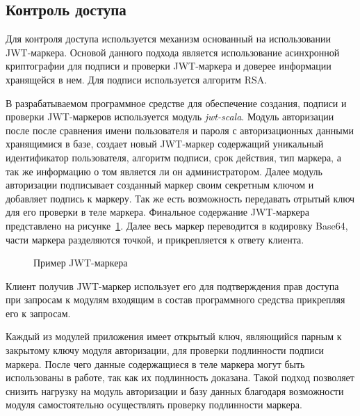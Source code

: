 \subsection{Контроль доступа}
\label{sec:development:access_control}
Для контроля доступа используется механизм основанный на использовании JWT-маркера. Основой данного подхода является использование асинхронной криптографии для подписи и проверки JWT-маркера и доверее информации хранящейся в нем. Для подписи используется алгоритм RSA.

В разрабатываемом программное средстве для обеспечение создания, подписи и проверки JWT-маркеров используется модуль \emph{jwt-scala}. Модуль авторизации после после сравнения имени пользователя и пароля с авторизационных данными хранящимися в базе, создает новый JWT-маркер содержащий уникальный идентификатор пользователя, алгоритм подписи, срок действия, тип маркера, а так же информацию о том является ли он администратором. Далее модуль авторизации подписывает созданный маркер своим секретным ключом и добавляет подпись к маркеру. Так же есть возможность передавать отрытый ключ для его проверки в теле маркера.
Финальное содержание JWT-маркера представлено на рисунке~\ref{listing:development:jwt_token}. Далее весь маркер переводится в кодировку Base64, части маркера разделяются точкой, и прикрепляется к ответу клиента.

\begin{figure}[ht]
    \centering
    
    \caption{Пример JWT-маркера}
    \label{listing:development:jwt_token}
\end{figure}    

Клиент получив JWT-маркер использует его для подтверждения прав доступа при запросам к модулям входящим в состав программного средства прикрепляя его к запросам.

Каждый из модулей приложения имеет открытый ключ, являющийся парным к закрытому ключу модуля авторизации, для проверки подлинности подписи маркера. После чего данные содержащиеся в теле маркера могут быть использованы в работе, так как их подлинность доказана. Такой подход позволяет снизить нагрузку на модуль авторизации и базу данных благодаря возможности модуля самостоятельно осуществлять проверку подлинности маркера.

